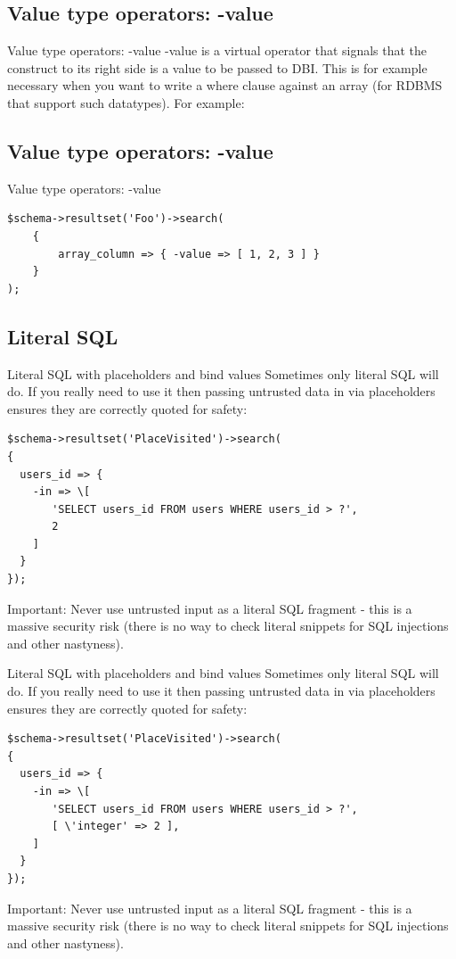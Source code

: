 \subsection{Value type operators: -value}

Value type operators: -value
-value is a virtual operator that signals that the construct to its right
side is a value to be passed to DBI. This is for example necessary when you
want to write a where clause against an array (for RDBMS that support such
datatypes). For example:

\subsection{Value type operators: -value}
\begin{frame}[fragile]{Value type operators: -value}
\begin{lstlisting}
$schema->resultset('Foo')->search(
    {
        array_column => { -value => [ 1, 2, 3 ] }
    }
);
\end{lstlisting}
\end{frame}

\subsection{Literal SQL}

\begin{frame}[fragile]{Literal SQL with placeholders and bind values}
Sometimes only literal SQL will do. 
If you really need to  use it then passing untrusted data in via placeholders ensures they are correctly quoted for safety:

\begin{lstlisting}
$schema->resultset('PlaceVisited')->search(
{
  users_id => {
    -in => \[
       'SELECT users_id FROM users WHERE users_id > ?',
       2
    ]
  }
});
\end{lstlisting}

Important: Never use untrusted input as a literal SQL fragment - this is a
massive security risk (there is no way to check literal snippets for SQL
injections and other nastyness).

\end{frame}

\begin{frame}[fragile]{Literal SQL with placeholders and bind values}
Sometimes only literal SQL will do. 
If you really need to  use it then passing untrusted data in via placeholders ensures they are correctly quoted for safety:

\begin{lstlisting}
$schema->resultset('PlaceVisited')->search(
{
  users_id => {
    -in => \[
       'SELECT users_id FROM users WHERE users_id > ?',
       [ \'integer' => 2 ],
    ]
  }
});
\end{lstlisting}

Important: Never use untrusted input as a literal SQL fragment - this is a
massive security risk (there is no way to check literal snippets for SQL
injections and other nastyness).

\end{frame}


